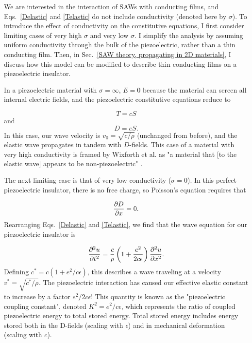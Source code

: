 \documentclass[double,12pt,1in,seploa]{beavtex}
\begin{document}
We are interested in the interaction of SAWs with conducting films, and Eqs.\ \ref{Delastic} and \ref{Telastic} do not include conductivity (denoted here by $\sigma$). To introduce the effect of conductivity on the constitutive equations, I first consider limiting cases of very high $\sigma$ and very low $\sigma$. I simplify the analysis by assuming uniform conductivity through the bulk of the piezoelectric, rather than a thin conducting film. Then, in Sec.\ \ref{SAW theory, propagating in 2D materials}, I discuss how this model can be modified to describe thin conducting films on a piezoelectric insulator.

In a piezoelectric material with $\sigma = \infty$, $E = 0$ because the material can screen all internal electric fields, and the piezoelectric constitutive equations reduce to 

\begin{equation}
    T = cS
\end{equation}
and
\begin{equation}
    D = eS.
\end{equation}
In this case, our wave velocity is $v_0 = \sqrt{c/\rho}$ (unchanged from before), and the elastic wave propagates in tandem with $D$-fields. This case of a material with very high conductivity is framed by Wixforth et al.  as "a material that [to the elastic wave] appears to be non-piezoelectric" \cite{wixforth_surface_1989}.

The next limiting case is that of very low conductivity ($\sigma = 0$). In this perfect piezoelectric insulator, there is no free charge, so Poisson's equation requires that 

\begin{equation}
    \pdv{D}{x} = 0.
\end{equation}
Rearranging Eqs.\ \ref{Delastic} and \ref{Telastic}, we find that the wave equation for our piezoelectric insulator is

\begin{equation}
    \pdv[2]{u}{t} = \frac{c}{\rho} \left(1 + \frac{e^2}{2c\epsilon}\right) \pdv[2]{u}{x}. \label{wave eqn for insulator}
\end{equation}
Defining $c^* = c(1 + e^2/c\epsilon)$, this describes a wave traveling at a velocity $v^* =\sqrt{c^*/\rho}$. The piezoelectric interaction has caused our effective elastic constant to increase by a factor $e^2/2c\epsilon$! This quantity is known as the "piezoelectric coupling constant", denoted $K^2 = e^2/c\epsilon$, which represents the ratio of coupled piezoelectric energy to total stored energy. Total stored energy includes energy stored both in the D-fields (scaling with $\epsilon$) and in mechanical deformation (scaling with $c$). 
\end{document}
